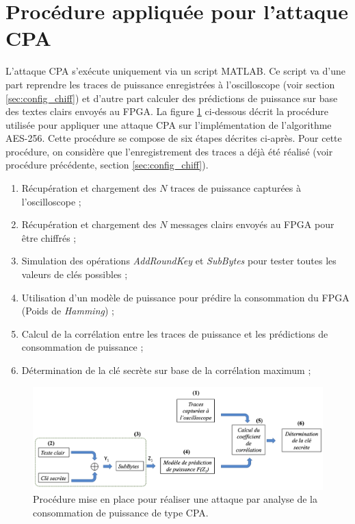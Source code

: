 \documentclass[oneside]{book}
\begin{document}
\newpage

\section{Procédure appliquée pour l'attaque CPA}
\label{sec:CPA_App}

L'attaque CPA s'exécute uniquement via un script MATLAB. Ce script va d'une part reprendre les traces de puissance enregistrées à l'oscilloscope (voir section \ref{sec:config_chiff}) et d'autre part calculer des prédictions de puissance sur base des textes clairs envoyés au FPGA. La figure \ref{fig:procedure_2} ci-dessous décrit la procédure utilisée pour appliquer une attaque CPA sur l'implémentation de l'algorithme AES-256. Cette procédure se compose de six étapes décrites ci-après. Pour cette procédure, on considère que l'enregistrement des traces a déjà été réalisé (voir procédure précédente, section \ref{sec:config_chiff}).
\begin{enumerate}
\item Récupération et chargement des $N$ traces de puissance capturées à l'oscilloscope ;
\item Récupération et chargement des $N$ messages clairs envoyés au FPGA pour être chiffrés ;
\item Simulation des opérations \textit{AddRoundKey} et \textit{SubBytes} pour tester toutes les valeurs de clés possibles ;
\item Utilisation d'un modèle de puissance pour prédire la consommation du FPGA (Poids de \textit{Hamming}) ;
\item Calcul de la corrélation entre les traces de puissance et les prédictions de consommation de puissance ;
\item Détermination de la clé secrète sur base de la corrélation maximum ;
\end{enumerate}

\begin{figure}[htbp]
    \centering
    \includegraphics[scale=0.56]{image/procedure_2}
    \caption{Procédure mise en place pour réaliser une attaque par analyse de la consommation de puissance de type CPA.}
    \label{fig:procedure_2} 
\end{figure}
\end{document}

